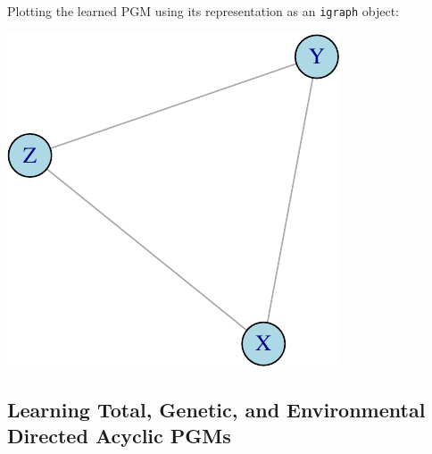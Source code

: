 \documentclass[]{article}
\newenvironment{Shaded}{\begin{snugshade}}{\end{snugshade}}
\newcommand{\KeywordTok}[1]{\textcolor[rgb]{0.13,0.29,0.53}{\textbf{#1}}}
\newcommand{\DataTypeTok}[1]{\textcolor[rgb]{0.13,0.29,0.53}{#1}}
\newcommand{\DecValTok}[1]{\textcolor[rgb]{0.00,0.00,0.81}{#1}}
\newcommand{\StringTok}[1]{\textcolor[rgb]{0.31,0.60,0.02}{#1}}
\newcommand{\CommentTok}[1]{\textcolor[rgb]{0.56,0.35,0.01}{\textit{#1}}}
\newcommand{\OperatorTok}[1]{\textcolor[rgb]{0.81,0.36,0.00}{\textbf{#1}}}
\newcommand{\NormalTok}[1]{#1}
\begin{document}
Plotting the learned PGM using its representation as an \texttt{igraph}
object:

\begin{Shaded}
\end{Shaded}

\includegraphics{familybasedpgms-example_files/figure-latex/unnamed-chunk-18-1.pdf}

\subsection{Learning Total, Genetic, and Environmental Directed Acyclic
PGMs}\label{learning-total-genetic-and-environmental-directed-acyclic-pgms}
\end{document}
